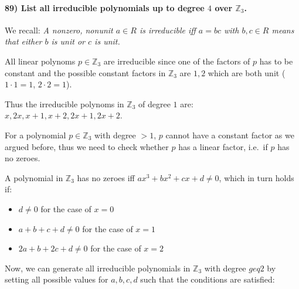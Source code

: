 \documentclass[
]{article}
\providecommand{\tightlist}{%
  \setlength{\itemsep}{0pt}\setlength{\parskip}{0pt}}
\begin{document}
\hypertarget{list-all-irreducible-polynomials-up-to-degree-4-over-mathbbz_3.}{%
\paragraph{\texorpdfstring{89) List all irreducible polynomials up to
degree \(4\) over
\(\mathbb{Z}_3\).}{89) List all irreducible polynomials up to degree 4 over \textbackslash mathbb\{Z\}\_3.}}\label{list-all-irreducible-polynomials-up-to-degree-4-over-mathbbz_3.}}

We recall: \emph{A nonzero, nonunit \(a \in R\) is irreducible iff
\(a=bc\) with \(b,c \in R\) means that either \(b\) is unit or \(c\) is
unit.}

All linear polynoms \(p \in \mathbb{Z}_3\) are irreducible since one of
the factors of \(p\) has to be constant and the possible constant
factors in \(\mathbb{Z}_3\) are \(1,2\) which are both unit
(\(1 \cdot 1 = 1\), \(2 \cdot 2 = 1\)).

Thus the irreducible polynoms in \(\mathbb{Z}_3\) of degree \(1\) are:
\(x, 2x, x+1, x+2, 2x+1, 2x+2\).

For a polynomial \(p \in \mathbb{Z}_3\) with degree \(>1\), \(p\) cannot
have a constant factor as we argued before, thus we need to check
whether \(p\) has a linear factor, i.e.~if \(p\) has no zeroes.

A polynomial in \(\mathbb{Z}_3\) has no zeroes iff
\(ax^3 +bx^2 + cx + d \neq 0\), which in turn holds if:

\begin{itemize}
\tightlist
\item
  \(d \neq 0\) for the case of \(x = 0\)
\item
  \(a+b+c+d \neq 0\) for the case of \(x = 1\)
\item
  \(2a + b + 2c + d \neq 0\) for the case of \(x = 2\)
\end{itemize}

Now, we can generate all irreducible polynomials in \(\mathbb{Z}_3\)
with degree \(geq 2\) by setting all possible values for \(a,b,c,d\)
such that the conditions are satisfied:
\end{document}
